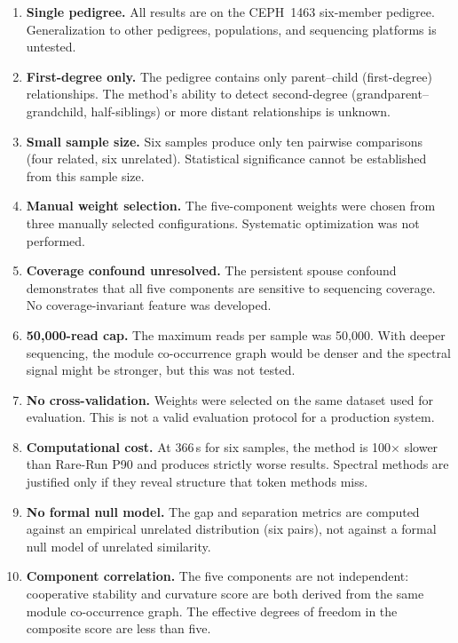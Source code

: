 \documentclass{../yalumba}
\begin{document}
\begin{enumerate}
\item \textbf{Single pedigree.}  All results are on the CEPH~1463
  six-member pedigree.  Generalization to other pedigrees, populations,
  and sequencing platforms is untested.

\item \textbf{First-degree only.}  The pedigree contains only
  parent--child (first-degree) relationships.  The method's ability to
  detect second-degree (grandparent--grandchild, half-siblings) or
  more distant relationships is unknown.

\item \textbf{Small sample size.}  Six samples produce only ten
  pairwise comparisons (four related, six unrelated).  Statistical
  significance cannot be established from this sample size.

\item \textbf{Manual weight selection.}  The five-component weights
  were chosen from three manually selected configurations.  Systematic
  optimization was not performed.

\item \textbf{Coverage confound unresolved.}  The persistent spouse
  confound demonstrates that all five components are sensitive to
  sequencing coverage.  No coverage-invariant feature was developed.

\item \textbf{50{,}000-read cap.}  The maximum reads per sample was
  50{,}000.  With deeper sequencing, the module co-occurrence graph
  would be denser and the spectral signal might be stronger, but
  this was not tested.

\item \textbf{No cross-validation.}  Weights were selected on the
  same dataset used for evaluation.  This is not a valid evaluation
  protocol for a production system.

\item \textbf{Computational cost.}  At 366\,s for six samples, the
  method is 100$\times$ slower than Rare-Run P90 and produces
  strictly worse results.  Spectral methods are justified only if they
  reveal structure that token methods miss.

\item \textbf{No formal null model.}  The gap and separation metrics
  are computed against an empirical unrelated distribution (six pairs),
  not against a formal null model of unrelated similarity.

\item \textbf{Component correlation.}  The five components are not
  independent: cooperative stability and curvature score are both
  derived from the same module co-occurrence graph.  The effective
  degrees of freedom in the composite score are less than five.
\end{enumerate}
\end{document}
